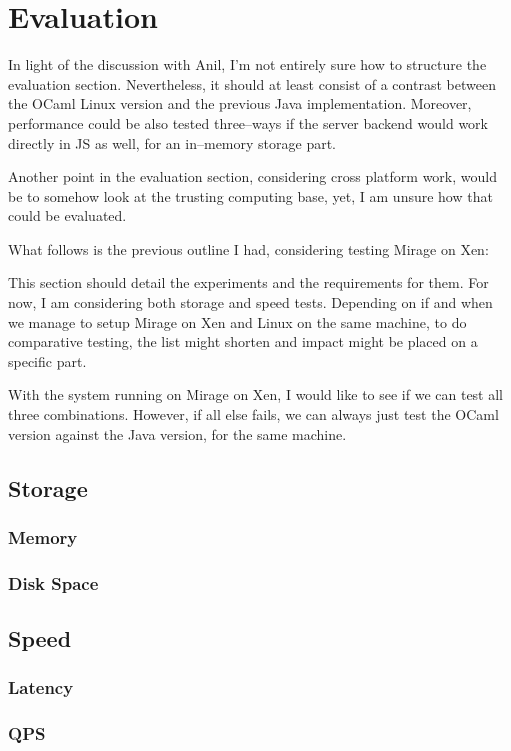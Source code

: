 \chapter{Evaluation}

In light of the discussion with Anil, I'm not entirely sure how to structure the evaluation section.
Nevertheless, it should at least consist of a contrast between the OCaml Linux version and the previous Java implementation.
Moreover, performance could be also tested three--ways if the server backend would work directly in JS as well, for an in--memory storage part.

Another point in the evaluation section, considering cross platform work, would be to somehow look at the trusting computing base, yet, I am unsure how that could be evaluated.

What follows is the previous outline I had, considering testing Mirage on Xen:

This section should detail the experiments and the requirements for them.
For now, I am considering both storage and speed tests.
Depending on if and when we manage to setup Mirage on Xen and Linux on the same machine, to do comparative testing, the list might shorten and impact might be placed on a specific part.

With the system running on Mirage on Xen, I would like to see if we can test all three combinations.
However, if all else fails, we can always just test the OCaml version against the Java version, for the same machine.

\section{Storage}
\subsection{Memory}
\subsection{Disk Space}

\section{Speed}
\subsection{Latency}
\subsection{QPS}
